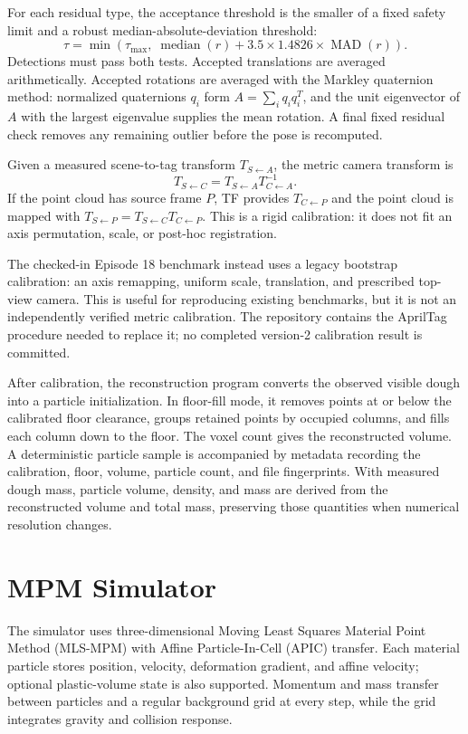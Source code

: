 \documentclass[10pt,a4paper]{article}
\begin{document}
For each residual type, the acceptance threshold is the smaller of a fixed safety limit and a robust median-absolute-deviation threshold:
\[
\tau=\min\left(\tau_{\max},\;\operatorname{median}(r)+3.5\times1.4826\times\operatorname{MAD}(r)\right).
\]
Detections must pass both tests. Accepted translations are averaged arithmetically. Accepted rotations are averaged with the Markley quaternion method: normalized quaternions $q_i$ form $A=\sum_iq_iq_i^T$, and the unit eigenvector of $A$ with the largest eigenvalue supplies the mean rotation. A final fixed residual check removes any remaining outlier before the pose is recomputed.

Given a measured scene-to-tag transform $T_{S\leftarrow A}$, the metric camera transform is
\[
T_{S\leftarrow C}=T_{S\leftarrow A}T_{C\leftarrow A}^{-1}.
\]
If the point cloud has source frame $P$, TF provides $T_{C\leftarrow P}$ and the point cloud is mapped with $T_{S\leftarrow P}=T_{S\leftarrow C}T_{C\leftarrow P}$. This is a rigid calibration: it does not fit an axis permutation, scale, or post-hoc registration.

The checked-in Episode 18 benchmark instead uses a legacy bootstrap calibration: an axis remapping, uniform scale, translation, and prescribed top-view camera. This is useful for reproducing existing benchmarks, but it is not an independently verified metric calibration. The repository contains the AprilTag procedure needed to replace it; no completed version-2 calibration result is committed.

After calibration, the reconstruction program converts the observed visible dough into a particle initialization. In floor-fill mode, it removes points at or below the calibrated floor clearance, groups retained points by occupied columns, and fills each column down to the floor. The voxel count gives the reconstructed volume. A deterministic particle sample is accompanied by metadata recording the calibration, floor, volume, particle count, and file fingerprints. With measured dough mass, particle volume, density, and mass are derived from the reconstructed volume and total mass, preserving those quantities when numerical resolution changes.

\section{MPM Simulator}

The simulator uses three-dimensional Moving Least Squares Material Point Method (MLS-MPM) with Affine Particle-In-Cell (APIC) transfer. Each material particle stores position, velocity, deformation gradient, and affine velocity; optional plastic-volume state is also supported. Momentum and mass transfer between particles and a regular background grid at every step, while the grid integrates gravity and collision response.
\end{document}
